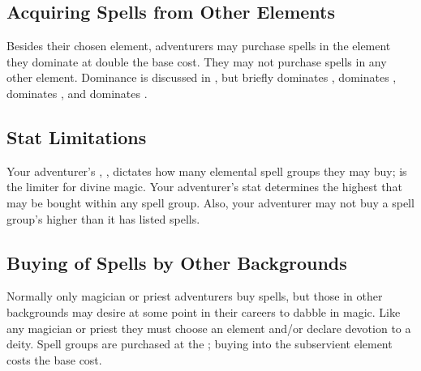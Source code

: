 \begin{multicols*}{2}
\subsection{Acquiring Spells from Other Elements}
Besides their chosen element, adventurers may purchase spells in the element they dominate at double the base cost. They may not purchase spells in any other element.
Dominance is discussed in , but briefly  dominates ,  dominates ,  dominates , and  dominates . 
\subsection{Stat Limitations}
Your adventurer's \INT, , dictates how many elemental spell groups they may buy; \CSE is the limiter for divine magic. Your adventurer's \PWR stat determines the highest  that may be bought within any spell group. Also, your adventurer may not buy a spell group's  higher than it has listed spells.

\subsection{Buying of Spells by Other Backgrounds}
Normally only magician or priest adventurers buy spells, but those in other backgrounds may desire at some point in their careers to dabble in magic. Like any magician or priest they must choose an element and/or declare devotion to a deity. Spell groups are purchased at  the ; buying into the subservient element costs  the base cost.


\end{multicols*}
